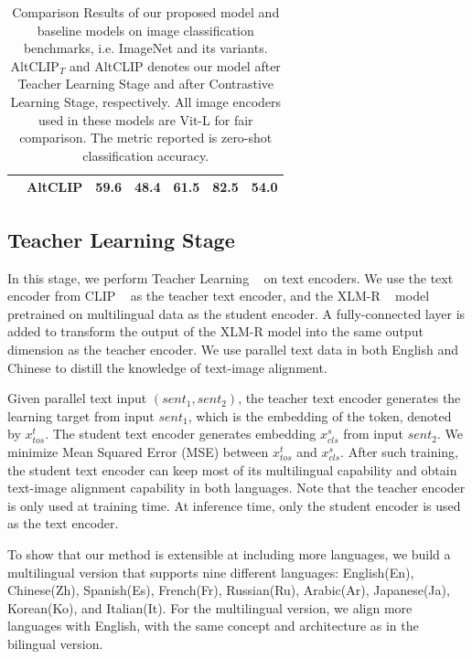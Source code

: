 \begin{table}[htb]
\begin{tabular}{clccccc}
                           & AltCLIP                                      & \textbf{59.6}     &\textbf{48.4}             & 61.5       & \textbf{82.5}       &\textbf {54.0}         \\
\hline
\end{tabular}
\caption{Comparison Results of our proposed model and baseline models on image classification benchmarks, i.e. ImageNet and its variants. AltCLIP$_{T}$ and AltCLIP denotes our model after Teacher Learning Stage and after Contrastive Learning Stage, respectively. All image encoders used in these models are Vit-L for fair comparison. The metric reported is zero-shot classification accuracy.}
\label{tab:imagenet}
\end{table}

\subsection{Teacher Learning Stage}
In this stage, we perform Teacher Learning ~\cite{hinton2015distilling} on text encoders. We use the text encoder from CLIP ~\cite{radford2021learning} as the teacher text encoder, and the XLM-R ~\cite{conneau2020unsupervised} model pretrained on multilingual data as the student encoder. A fully-connected layer is added to transform the output of the XLM-R model into the same output dimension as the teacher encoder. We use parallel text data in both English and Chinese to distill the knowledge of text-image alignment. 

Given parallel text input $(sent_1, sent_2)$, the teacher text encoder generates the learning target from input $sent_1$, which is the embedding of the \ttt{[TOS]} token, denoted by $x^{t}_{tos}$. The student text encoder generates embedding $x^{s}_{cls}$ from input $sent_2$. We minimize Mean Squared Error (MSE) between $x^{t}_{tos}$ and $x^{s}_{cls}$. 
After such training, the student text encoder can keep most of its multilingual capability and obtain text-image alignment capability in both languages. Note that the teacher encoder is only used at training time. At inference time, only the student encoder is used as the text encoder.

To show that our method is extensible at including more languages, we build a multilingual version that supports nine different languages: English(En), Chinese(Zh), Spanish(Es), French(Fr), Russian(Ru), Arabic(Ar), Japanese(Ja), Korean(Ko), and Italian(It). For the multilingual version, we align more languages with English, with the same concept and architecture as in the bilingual version.

